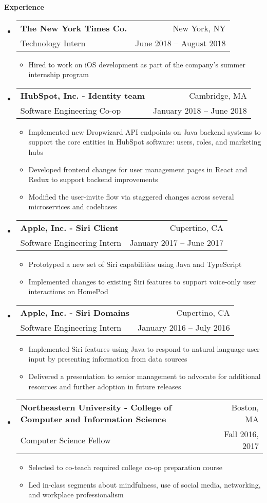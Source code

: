 \documentclass[letterpaper,10pt]{article}
\makeatletter
\newcommand{\resitem}[1]{\item #1 \vspace{-2pt}}
\newcommand{\resheading}[1]{{\large \colorbox{mygrey}{\begin{minipage}{\textwidth}{\textbf{#1 \vphantom{p\^{E}}}}\end{minipage}}}}
\newcommand{\ressubheading}[4]{
\begin{tabular*}{6.8in}{l@{\extracolsep{\fill}}r}
		\textbf{#1} & #2 \\
		\small{#3} & \small{#4} \\
\end{tabular*}\vspace{-6pt}}
\makeatother
\begin{document}
\resheading{Experience}
\begin{itemize}[leftmargin=*]
  \item[]
  \ressubheading{The New York Times Co.}{New York, NY}{Technology Intern}{June 2018 -- August 2018}
  {\footnotesize
    \begin{itemize}
      \resitem{Hired to work on iOS development as part of the company's summer internship program}
  \end{itemize}}
  \item[]
  \ressubheading{HubSpot, Inc. - \small{Identity team}}{Cambridge, MA}{Software Engineering Co-op}{January 2018 -- June 2018}
  {\footnotesize
    \begin{itemize}
      \resitem{Implemented new Dropwizard API endpoints on Java backend systems to support the core entities in HubSpot software: users, roles, and marketing hubs}
      \resitem{Developed frontend changes for user management pages in React and Redux to support backend improvements}
      \resitem{Modified the user-invite flow via staggered changes across several microservices and codebases}
  \end{itemize}}
	\item[]
	\ressubheading{Apple, Inc. - \small{Siri Client}}{Cupertino, CA}{Software Engineering Intern}{January 2017 -- June 2017}
	{\footnotesize
		\begin{itemize}
			\resitem{Prototyped a new set of Siri capabilities using Java and TypeScript}
			\resitem{Implemented changes to existing Siri features to support voice-only user interactions on HomePod}
	\end{itemize}}
	\item[]
	\ressubheading{Apple, Inc. - \small{Siri Domains}}{Cupertino, CA}{Software Engineering Intern}{January 2016 -- July 2016}
	{\footnotesize
		\begin{itemize}
			\resitem{Implemented Siri features using Java to respond to natural language user input by presenting information from data sources}
			\resitem{Delivered a presentation to senior management to advocate for additional resources and further adoption in future releases}
	\end{itemize}}
	\item[]
	\ressubheading{Northeastern University - \small{College of Computer and Information Science}}{Boston, MA}{Computer Science Fellow}{Fall 2016, 2017}
	{\footnotesize
		\begin{itemize}
			\resitem{Selected to co-teach required college co-op preparation course}
			\resitem{Led in-class segments about mindfulness, use of social media, networking, and workplace professionalism}

\end{itemize}}
\end{itemize}
\end{document}
